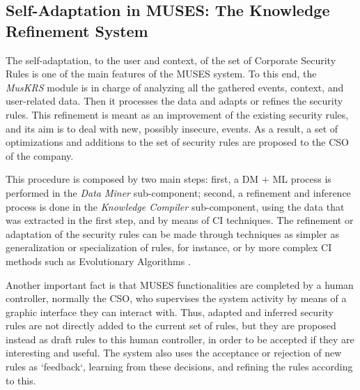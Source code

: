 
\subsection{Self-Adaptation in MUSES: The Knowledge Refinement System}

The self-adaptation, to the user and context, of the set of Corporate Security Rules is one of the main features of the MUSES system.
To this end, the \textit{MusKRS} module is in charge of analyzing all the gathered events, context, and user-related data. Then it processes the data and adapts or refines the security rules. This refinement is meant as an improvement of the existing security rules, and its aim is to deal with new, possibly insecure, events. As a result, a set of optimizations and additions to the set of security rules are proposed to the CSO of the company.

This procedure is composed by two main steps: first, a DM \cite{DataMining_Lee01} + ML \cite{MachineLearning_Bishop06} process is performed in the \textit{Data Miner} sub-component; second, a refinement and inference process is done in the \textit{Knowledge Compiler} sub-component, using the data that was extracted in the first step, and by means of CI techniques.
The refinement or adaptation of the security rules can be made through techniques as simpler as generalization or specialization of rules, for instance, or by more complex CI methods such as Evolutionary Algorithms \cite{EAs_Back96}.

Another important fact is that MUSES functionalities are completed by a human controller, normally the CSO, who supervises the system activity by means of a graphic interface they can interact with. 
Thus, adapted and inferred security rules are not directly added to the current set of rules, but they are proposed instead as draft rules to this human controller, in order to be accepted if they are interesting and useful. The system also uses the acceptance or rejection of new rules as `feedback`, learning from these decisions, and refining the rules according to this.

